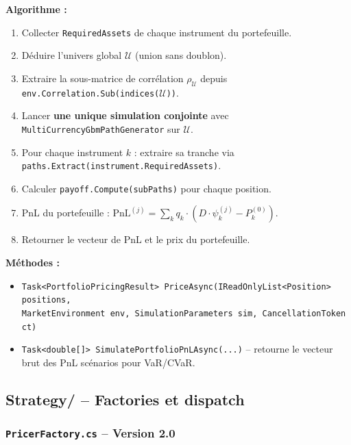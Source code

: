 \documentclass[a4paper,11pt]{article}
\newcommand{\cs}[1]{\texttt{\color{codeinline}#1}}
\begin{document}
\textbf{Algorithme :}
\begin{enumerate}[leftmargin=1.5em]
  \item Collecter \cs{RequiredAssets} de chaque instrument du portefeuille.
  \item D\'eduire l'univers global $\mathcal{U}$ (union sans doublon).
  \item Extraire la sous-matrice de corr\'elation $\rho_\mathcal{U}$ depuis
        \cs{env.Correlation.Sub(indices($\mathcal{U}$))}.
  \item Lancer \textbf{une unique simulation conjointe} avec
        \cs{MultiCurrencyGbmPathGenerator} sur $\mathcal{U}$.
  \item Pour chaque instrument $k$ : extraire sa tranche via
        \cs{paths.Extract(instrument.RequiredAssets)}.
  \item Calculer \cs{payoff.Compute(subPaths)} pour chaque position.
  \item PnL du portefeuille : $\text{PnL}^{(j)} = \sum_k q_k \cdot (D \cdot \psi_k^{(j)} - P_k^{(0)})$.
  \item Retourner le vecteur de PnL et le prix du portefeuille.
\end{enumerate}

\textbf{M\'ethodes :}
\begin{itemize}[leftmargin=1.5em]
  \item \cs{Task<PortfolioPricingResult> PriceAsync(IReadOnlyList<Position> positions,}\\
        \cs{MarketEnvironment env, SimulationParameters sim, CancellationToken ct)}
  \item \cs{Task<double[]> SimulatePortfolioPnLAsync(...)} -- retourne le vecteur
        brut des PnL sc\'enarios pour VaR/CVaR.
\end{itemize}

\subsection{Strategy/ -- Factories et dispatch}

\subsubsection{\texttt{PricerFactory.cs} -- Version 2.0}
\end{document}
